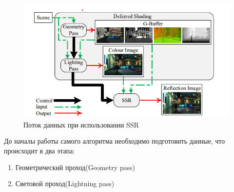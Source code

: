\documentclass[a4paper,14pt, unknownkeysallowed]{extreport}
\begin{document}
\begin{figure}[H]
	\centering
	\includegraphics{SSR_data_flow.png}
	\caption{Поток данных при использовании SSR}
	\label{fig:SSR_data_flow}
\end{figure} 

До началы работы самого алгоритма необходимо подготовить данные, что происходит в два этапа:
\begin{enumerate}
	\item Геометрический проход(Geometry pass)
	\item Световой проход(Lightning pass)
\end{enumerate}
\end{document}
